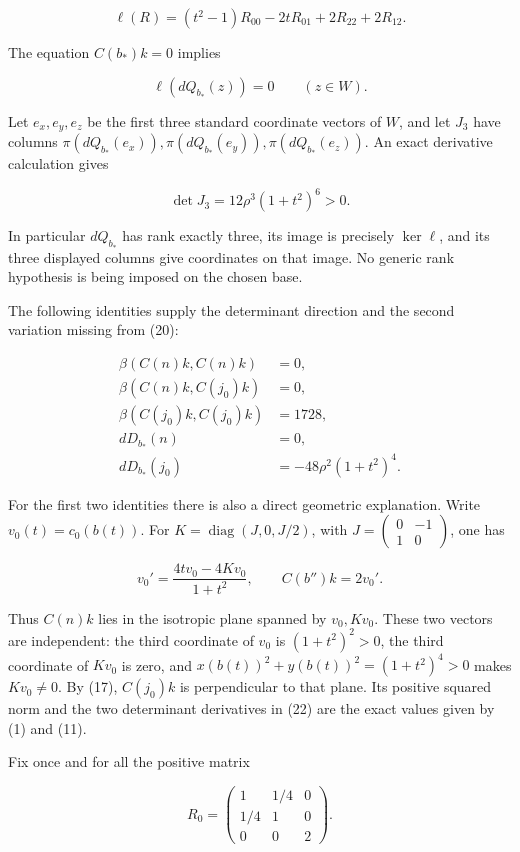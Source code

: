\documentclass[11pt]{article}
\begin{document}
\[
\ell(R)=(t^2-1)R_{00}-2tR_{01}+2R_{22}+2R_{12}.
\tag{19}
\]

The equation \(C(b_*)k=0\) implies

\[
\ell(dQ_{b_*}(z))=0\qquad(z\in W).
\tag{20}
\]

Let \(e_x,e_y,e_z\) be the first three standard coordinate vectors of
\(W\), and let \(J_3\) have columns
\(\pi(dQ_{b_*}(e_x)),\pi(dQ_{b_*}(e_y)),\pi(dQ_{b_*}(e_z))\).
An exact derivative calculation gives

\[
\det J_3=12\rho^3(1+t^2)^6>0.
\tag{21}
\]

In particular \(dQ_{b_*}\) has rank exactly three, its image is precisely
\(\ker\ell\), and its three displayed columns give coordinates on that
image. No generic rank hypothesis is being imposed on the chosen base.

The following identities supply the determinant direction and the second
variation missing from (20):

\[
\begin{aligned}
\beta(C(n)k,C(n)k)&=0,\\
\beta(C(n)k,C(j_0)k)&=0,\\
\beta(C(j_0)k,C(j_0)k)&=1728,\\
dD_{b_*}(n)&=0,\\
dD_{b_*}(j_0)&=-48\rho^2(1+t^2)^4.
\end{aligned}
\tag{22}
\]

For the first two identities there is also a direct geometric explanation.
Write \(v_0(t)=c_0(b(t))\). For
\(K=\operatorname{diag}(J,0,J/2)\), with
\(J=\left(\begin{smallmatrix}0&-1\\1&0\end{smallmatrix}\right)\), one has

\[
v_0'=\frac{4t v_0-4Kv_0}{1+t^2},\qquad C(b'')k=2v_0'.
\tag{23}
\]

Thus \(C(n)k\) lies in the isotropic plane spanned by \(v_0,Kv_0\).
These two vectors are independent: the third coordinate of \(v_0\) is
\((1+t^2)^2>0\), the third coordinate of \(Kv_0\) is zero, and
\(x(b(t))^2+y(b(t))^2=(1+t^2)^4>0\) makes \(Kv_0\ne0\).
By (17), \(C(j_0)k\) is perpendicular to that plane. Its positive squared
norm and the two determinant derivatives in (22) are the exact values
given by (1) and (11).

Fix once and for all the positive matrix

\[
R_0=\begin{pmatrix}1&1/4&0\\1/4&1&0\\0&0&2\end{pmatrix}.
\tag{24}
\]
\end{document}
